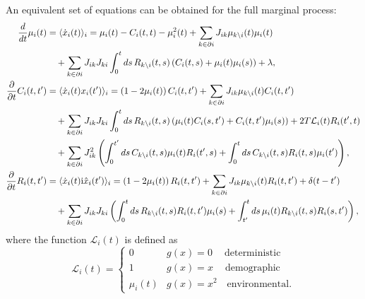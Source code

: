 \documentclass[
    preprint,
    linenumbers,
    amsmath,amssymb,amsfonts,
    aps, physrev,
    superscriptaddress,
    10pt,
    bibnotes
    ]{revtex4-2}
\begin{document}
An equivalent set of equations can be obtained for the full marginal process:
\begin{align}
  \frac{d}{dt}\mu_{i}(t) & = \langle \dot{x}_{i}(t) \rangle_{i} = \mu_{i}(t)-C_{i}(t,t)-\mu_{i}^2(t)+\sum_{k\in\partial i}J_{ik}\mu_{k\setminus i}(t)\mu_{i}(t) \nonumber \\
  &\quad+ \sum_{k\in \partial i}J_{ik}J_{ki}\int_{0}^{t}ds\, R_{k\setminus i}(t, s)\left(C_{i}(t, s)+\mu_{i}(t)\mu_{i}(s)\right) + \lambda,\\
  \frac{\partial}{\partial t}C_{i}(t,t') & = \langle \dot{x}_{i}(t) x_{i}(t') \rangle_{i} = \left(1 - 2 \mu_{i}(t) \right) C_{i}(t,t') + \sum_{k\in\partial i}J_{ik}\mu_{k\setminus i}(t)C_{i}(t,t') \nonumber\\
  & \quad + \sum_{k\in \partial i}J_{ik}J_{ki}\int_0^t ds\, R_{k\setminus i}(t,s)\left(\mu_{i}(t)C_{i}(s,t') + C_{i}(t,t')\mu_{i}(s)\right) + 2T \mathcal{L}_{i}(t)R_{i}(t',t) \nonumber \\
  & \quad + \sum_{k\in \partial i} J_{ik}^2 \left(\int_0^{t'} ds \, C_{k\setminus i}(t,s) \mu_{i}(t) R_{i}(t',s) + \int_0^{t} ds \, C_{k\setminus i}(t,s) R_{i}(t,s) \mu_{i}(t') \right),\\
  \frac{\partial}{\partial t}R_{i}(t,t') & =  \langle \dot{x}_{i}(t) {\rm i} \hat{x}_{i}(t') \rangle_{i} = \left(1 - 2 \mu_{i}(t) \right) R_{i}(t,t') + \sum_{k\in\partial i}J_{ik}\mu_{k\setminus i}(t)R_{i}(t,t') + \delta(t-t')  \nonumber\\
  & \quad + \sum_{k\in \partial i} J_{ik}J_{ki} \left( \int_{0}^{t} ds \, R_{k\setminus i}(t,s)R_{i}(t,t')\mu_{i}(s)+ \int_{t'}^{t} ds \, \mu_{i}(t)R_{k\setminus i}(t,s) R_{i}(s,t') \right),
\end{align}
where the function $\mathcal{L}_{i}(t)$ is defined as
\begin{equation}
  \mathcal{L}_{i}(t) = \begin{cases}
    0 & g(x) = 0 \quad \ \text{deterministic}\\
    1 & g(x) = x \quad \ \text{demographic}\\
    \mu_{i}(t) & g(x) = x^2 \quad \text{environmental}.
  \end{cases}
\end{equation}
\end{document}
